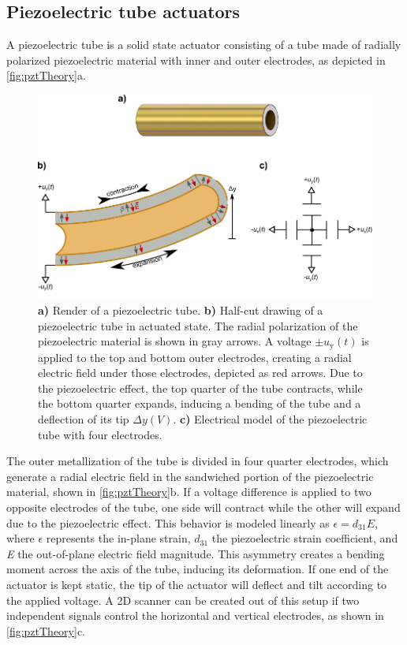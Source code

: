 {\subsection{Piezoelectric tube actuators}
A piezoelectric tube is a solid state actuator consisting of a tube made of radially polarized piezoelectric material with inner and outer electrodes, as depicted in \autoref{fig:pztTheory}a. 
\begin{figure}[h!]
      \centering
      \includegraphics{figures/20_Theory/Mechanical/pztTheory.pdf}
      \caption{	\textbf{a)} Render of a piezoelectric tube.
      			\textbf{b)} Half-cut drawing of a piezoelectric tube in actuated state. The radial polarization of the piezoelectric material is shown in gray arrows. A voltage $\pm u_\mathrm{y}(t)$ is applied to the top and bottom outer electrodes, creating a radial electric field under those electrodes, depicted as red arrows. Due to the piezoelectric effect, the top quarter of the tube contracts, while the bottom quarter expands, inducing a bending of the tube and a deflection of its tip $\Delta y(V)$.
      			\textbf{c)} Electrical model of the piezoelectric tube with four electrodes.}
      \label{fig:pztTheory}
\end{figure}
The outer metallization of the tube is divided in four quarter electrodes, which generate a radial electric field in the sandwiched portion of the piezoelectric material, shown in \autoref{fig:pztTheory}b. If a voltage difference is applied to two opposite electrodes of the tube, one side will contract while the other will expand due to the piezoelectric effect. This behavior is modeled linearly \cite{Arnau2008} as $\epsilon = d_{31} E$, where $\epsilon$ represents the in-plane strain, $d_{31}$ the piezoelectric strain coefficient, and \textit{E} the out-of-plane electric field magnitude. This asymmetry creates a bending moment across the axis of the tube, inducing its deformation. If one end of the actuator is kept static, the tip of the actuator will deflect and tilt according to the applied voltage. A 2D scanner can be created out of this setup if two independent signals control the horizontal and vertical electrodes, as shown in \autoref{fig:pztTheory}c.

}
